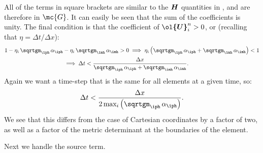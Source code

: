 \documentclass[10pt,preprint]{aastex}
\begin{document}
All of the terms in square brackets are similar to the $\boldsymbol{H}$ quantities in \citet{Qin2016}, and are therefore in $\mc{G}$. It can easily be seen that the sum of the coefficients is unity. The final condition is that the coefficient of $\vect{\ol{U}}^{n}_{i}>0$, or (recalling that $\eta=\Delta t/\Delta x$):
\begin{align*}
    1-\eta_{i}\,\sqrtgm_{\iph}\,\alpha_{\iph}&-\eta_{i}\,\sqrtgm_{\imh}\,\alpha_{\imh}>0\implies\eta_{i}\left(\sqrtgm_{\iph}\,\alpha_{\iph}+\sqrtgm_{\imh}\,\alpha_{\imh}\right)<1\\
    &\implies\Delta t<\f{\Delta x}{\sqrtgm_{\iph}\,\alpha_{\iph}+\sqrtgm_{\imh}\,\alpha_{\imh}}.
\end{align*}
Again we want a time-step that is the same for all elements at a given time, so:
\begin{equation*}
    \Delta t<\frac{\Delta x}{2\,\text{max}_{i}\left(\sqrtgm_{\iph}\,\alpha_{\iph}\right)}.
\end{equation*}
We see that this differs from the case of Cartesian coordinates by a factor of two, as well as a factor of the metric determinant at the boundaries of the element. 

Next we handle the source term.
\end{document}
